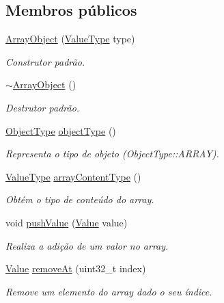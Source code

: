 \subsection*{Membros públicos}
\begin{DoxyCompactItemize}
\item 
\hyperlink{classArrayObject_afd91a9df894ad32f51e40da74de7f2c4}{Array\+Object} (\hyperlink{BasicTypes_8h_ad9971b6ef33e02ba2c75d19c1d2518a1}{Value\+Type} type)
\begin{DoxyCompactList}\small\item\em Construtor padrão. \end{DoxyCompactList}\item 
\hyperlink{classArrayObject_a91c9426247002224d484c32883ff51b1}{$\sim$\+Array\+Object} ()
\begin{DoxyCompactList}\small\item\em Destrutor padrão. \end{DoxyCompactList}\item 
\hyperlink{BasicTypes_8h_a842c5e2e69277690b064bf363c017980}{Object\+Type} \hyperlink{classArrayObject_a63034d166dcd6caad9261c86c338a417}{object\+Type} ()
\begin{DoxyCompactList}\small\item\em Representa o tipo de objeto (Object\+Type\+::\+A\+R\+R\+AY). \end{DoxyCompactList}\item 
\hyperlink{BasicTypes_8h_ad9971b6ef33e02ba2c75d19c1d2518a1}{Value\+Type} \hyperlink{classArrayObject_a389af37c0ab94e2c84985ab1698ce679}{array\+Content\+Type} ()
\begin{DoxyCompactList}\small\item\em Obtém o tipo de conteúdo do array. \end{DoxyCompactList}\item 
void \hyperlink{classArrayObject_a3f6f6445f0598bace2e29b338838333f}{push\+Value} (\hyperlink{structValue}{Value} value)
\begin{DoxyCompactList}\small\item\em Realiza a adição de um valor no array. \end{DoxyCompactList}\item 
\hyperlink{structValue}{Value} \hyperlink{classArrayObject_ab229e48175e46d03c2fab756cce11b5f}{remove\+At} (uint32\+\_\+t index)
\begin{DoxyCompactList}\small\item\em Remove um elemento do array dado o seu índice. \end{DoxyCompactList}\item 

\end{DoxyCompactItemize}

